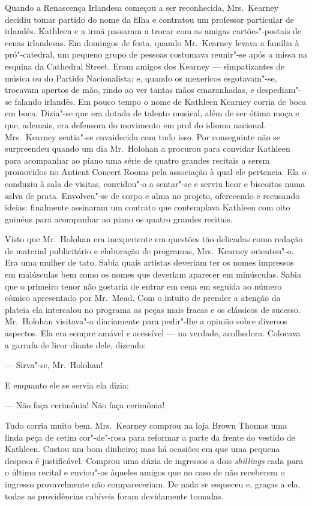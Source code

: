 Quando a Renascença Irlandesa começou a ser reconhecida, Mrs.~Kearney decidiu
tomar partido do nome da filha e contratou um professor particular de irlandês.
Kathleen e a irmã passaram a trocar com as amigas cartões"-postais de cenas
irlandesas.  Em domingos de festa, quando Mr.~Kearney levava a família à
pró"-catedral, um pequeno grupo de pessoas costumava reunir"-se após a missa na
esquina da Cathedral Street.  Eram amigos dos Kearney --- simpatizantes de
música ou do Partido Nacionalista; e, quando os mexericos esgotavam"-se,
trocavam apertos de mão, rindo ao ver tantas mãos emaranhadas, e despediam"-se
falando irlandês.  Em pouco tempo o nome de Kathleen Kearney corria de boca em
boca.  Dizia"-se que era dotada de talento musical, além de ser ótima moça e
que, ademais, era defensora do movimento em prol do idioma nacional.  
Mrs.~Kearney sentia"-se envaidecida com tudo isso.  Por conseguinte não se
surpreendeu quando um dia Mr.~Holohan a procurou para convidar Kathleen para
acompanhar ao piano uma série de quatro grandes recitais a serem promovidos no
Antient Concert Rooms pela associação à qual ele pertencia.  Ela o conduziu à
sala de visitas, convidou"-o a sentar"-se e serviu licor e biscoitos numa salva
de prata.  Envolveu"-se de corpo e alma no projeto, oferecendo e recusando
ideias: finalmente assinaram um contrato que contemplava Kathleen com oito
guinéus para acompanhar ao piano os quatro grandes recitais.

Visto que Mr.~Holohan era inexperiente em questões tão delicadas como redação
de material publicitário e elaboração de programas, Mrs.~Kearney orientou"-o.
Era uma mulher de tato.  Sabia quais artistas deveriam ter os nomes impressos
em maiúsculas bem como os nomes que deveriam aparecer em minúsculas.  Sabia que
o primeiro tenor não gostaria de entrar em cena em seguida ao número cômico
apresentado por Mr.~Mead.  Com o intuito de prender a atenção da plateia ela
intercalou no programa as peças mais fracas e os clássicos de sucesso.  Mr.~Holohan 
visitava"-a diariamente para pedir"-lhe a opinião sobre diversos
aspectos.  Ela era sempre amável e acessível --- na verdade, acolhedora.
Colocava a garrafa de licor diante dele, dizendo:

--- Sirva"-se, Mr.~Holohan!

E enquanto ele se servia ela dizia:

--- Não faça cerimônia!  Não faça cerimônia!

Tudo corria muito bem.  Mrs.~Kearney comprou na loja Brown Thomas uma linda
peça de cetim cor"-de"-rosa para reformar a parte da frente do vestido de
Kathleen.  Custou um bom dinheiro; mas há ocasiões em que uma pequena despesa é
justificável.  Comprou uma dúzia de ingressos a dois \textit{shillings} cada
para o último recital e enviou"-os àqueles amigos que no caso de não receberem o
ingresso provavelmente não compareceriam.  De nada se esqueceu e, graças a ela,
todas as providências cabíveis foram devidamente tomadas.

